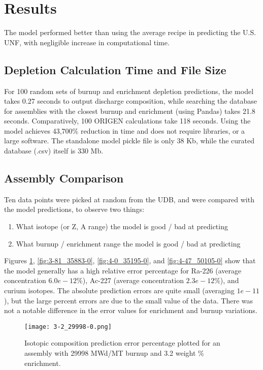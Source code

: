 \section{Results}

The model performed better than using the average
recipe in predicting the U.S. \gls{UNF}, with
negligible increase in computational time.

\subsection{Depletion Calculation Time and File Size}
For 100 random sets of
burnup and enrichment depletion predictions,
the model takes 0.27 seconds to output discharge composition, while
searching the database for assemblies
with the closest burnup and enrichment (using Pandas)
takes 21.8 seconds. Comparatively, 100 \gls{ORIGEN} calculations
take 118 seconds. Using the model achieves 43,700\% reduction
in time and does not require libraries, or a large software.
The standalone model pickle file is only
38 Kb, while the curated database (.csv) itself is 330 Mb.

\subsection{Assembly Comparison}

Ten data points were picked at random from the \gls{UDB},
and were compared with the model predictions, to observe
two things:
\begin{enumerate}
    \item What isotope (or Z, A range) the model is good / bad
        at predicting
    \item What burnup / enrichment range the model is good / bad
        at predicting
\end{enumerate}

Figures \ref{fig:3-2_29998-0}, \ref{fig:3-81_35883-0},
\ref{fig:4-0_35195-0}, and \ref{fig:4-47_50105-0}
show that the model
generally has a high relative error percentage for Ra-226
(average concentration $6.0e-12\%$), Ac-227 (average concentration  $2.3e-12\%$), and curium isotopes.
The absolute prediction errors are quite small
(averaging $1e-11$), but the large percent errors are due
to the small value of the data. There was not a notable
difference in the error values for enrichment
and burnup variations.

\begin{figure}
    \centering
    \texttt{[image: 3-2\_29998-0.png]}
    \caption{Isotopic composition prediction error percentage
             plotted for an assembly with 
             29998 MWd/MT burnup and 3.2 weight \% enrichment.}
    \label{fig:3-2_29998-0}
\end{figure}

